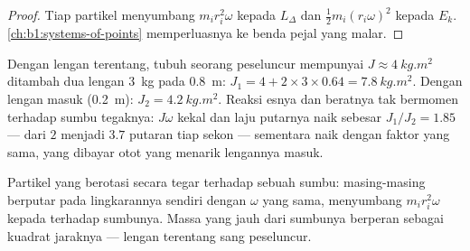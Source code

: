 \begin{proof}
Tiap partikel menyumbang $m_ir_i^2\omega$ kepada $L_\Delta$ dan
$\tfrac12 m_i(r_i\omega)^2$ kepada $E_k$. \cref{ch:b1:systems-of-points}
memperluasnya ke benda pejal yang malar.
\end{proof}

\begin{example}\label{ex:b1:angular-momentum:skater}
Dengan lengan terentang, tubuh seorang peseluncur mempunyai
$J \approx \qty{4}{kg.m^2}$ ditambah dua lengan \qty{3}{kg} pada
\qty{0.8}{m}: $J_1 = 4 + 2 \times 3 \times 0.64 =
\qty{7.8}{kg.m^2}$. Dengan lengan masuk (\qty{0.2}{m}): $J_2 = \qty{4.2}{kg.m^2}$.
Reaksi esnya dan beratnya tak bermomen terhadap sumbu tegaknya:
$J\omega$ kekal dan laju putarnya naik sebesar $J_1/J_2 = 1.85$ --- dari
$2$ menjadi $3.7$ putaran tiap sekon --- sementara 
naik dengan faktor yang sama, yang dibayar otot yang menarik lengannya masuk.
\end{example}

\begin{omfigure}

{\small Partikel yang berotasi secara tegar terhadap sebuah sumbu:
masing-masing berputar pada lingkarannya sendiri dengan $\omega$ yang
sama, menyumbang $m_ir_i^2\omega$ kepada  terhadap
sumbunya. Massa yang jauh dari sumbunya berperan sebagai kuadrat
jaraknya --- lengan terentang sang peseluncur.}
\end{omfigure}

